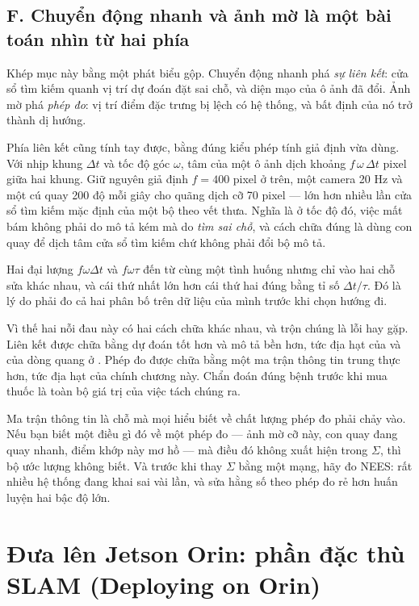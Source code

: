 \documentclass[../../deep_learning.tex]{subfiles}
\begin{document}
\subsection{F. Chuyển động nhanh và ảnh mờ là một bài toán nhìn từ hai phía}

Khép mục này bằng một phát biểu gộp. Chuyển động nhanh phá \emph{sự liên kết}: cửa sổ tìm kiếm quanh vị trí dự đoán đặt sai chỗ, và diện mạo của ô ảnh đã đổi. Ảnh mờ phá \emph{phép đo}: vị trí điểm đặc trưng bị lệch có hệ thống, và bất định của nó trở thành dị hướng.

Phía liên kết cũng tính tay được, bằng đúng kiểu phép tính giả định vừa dùng. Với nhịp khung \(\Delta t\) và tốc độ góc \(\omega\), tâm của một ô ảnh dịch khoảng \(f\,\omega\,\Delta t\) pixel giữa hai khung. Giữ nguyên giả định \(f=400\) pixel ở trên, một camera 20 Hz và một cú quay 200 độ mỗi giây cho quãng dịch cỡ 70 pixel --- lớn hơn nhiều lần cửa sổ tìm kiếm mặc định của một bộ theo vết thưa. Nghĩa là ở tốc độ đó, việc mất bám không phải do mô tả kém mà do \emph{tìm sai chỗ}, và cách chữa đúng là dùng con quay để dịch tâm cửa sổ tìm kiếm chứ không phải đổi bộ mô tả.

Hai đại lượng \(f\omega\Delta t\) và \(f\omega\tau\) đến từ cùng một tình huống nhưng chỉ vào hai chỗ sửa khác nhau, và cái thứ nhất lớn hơn cái thứ hai đúng bằng tỉ số \(\Delta t/\tau\). Đó là lý do phải đo cả hai phân bố trên dữ liệu của mình trước khi chọn hướng đi.

Vì thế hai nỗi đau này có hai cách chữa khác nhau, và trộn chúng là lỗi hay gặp. Liên kết được chữa bằng dự đoán tốt hơn và mô tả bền hơn, tức địa hạt của  và của dòng quang ở . Phép đo được chữa bằng một ma trận thông tin trung thực hơn, tức địa hạt của chính chương này. Chẩn đoán đúng bệnh trước khi mua thuốc là toàn bộ giá trị của việc tách chúng ra.

\begin{cannho}
Ma trận thông tin là chỗ mà mọi hiểu biết về chất lượng phép đo phải chảy vào. Nếu bạn biết một điều gì đó về một phép đo --- ảnh mờ cỡ này, con quay đang quay nhanh, điểm khớp này mơ hồ --- mà điều đó không xuất hiện trong \(\Sigma\), thì bộ ước lượng không biết. Và trước khi thay \(\Sigma\) bằng một mạng, hãy đo NEES: rất nhiều hệ thống đang khai sai vài lần, và sửa hằng số theo phép đo rẻ hơn huấn luyện hai bậc độ lớn. 
\end{cannho}

\section{Đưa lên Jetson Orin: phần đặc thù SLAM (Deploying on Orin)}
\end{document}
